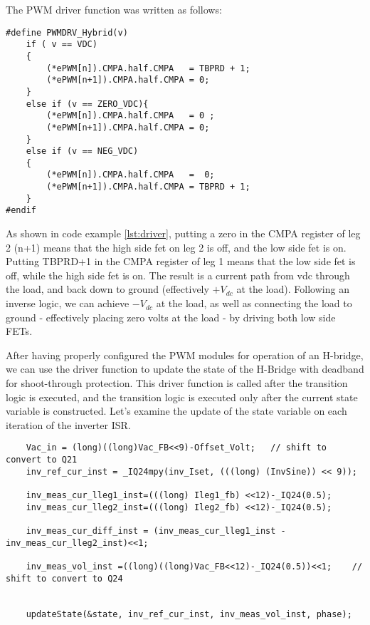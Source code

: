 The PWM driver function was written as follows:
\begin{lstlisting}[label={lst:driver}]
#define PWMDRV_Hybrid(v)
	if ( v == VDC)
	{
		(*ePWM[n]).CMPA.half.CMPA	= TBPRD + 1;
		(*ePWM[n+1]).CMPA.half.CMPA	= 0;
	}
	else if (v == ZERO_VDC){
		(*ePWM[n]).CMPA.half.CMPA	= 0 ;
		(*ePWM[n+1]).CMPA.half.CMPA	= 0;
	}
	else if (v == NEG_VDC)
	{
		(*ePWM[n]).CMPA.half.CMPA	=  0;
		(*ePWM[n+1]).CMPA.half.CMPA	= TBPRD + 1;
	}
#endif
\end{lstlisting}

As shown in code example \ref{lst:driver}, putting a zero in the CMPA register of leg 2 (n+1) means that the high side fet on leg 2 is off, and the low side fet is on. Putting TBPRD+1 in the CMPA register of  leg 1 means that the low side fet is off, while the high side fet is on. 
The result is a current path from vdc through the load, and back down to ground (effectively $+V_{dc}$ at the load). Following an inverse logic, we can achieve $-V_{dc}$ at the load, as well as connecting the load to ground - effectively placing zero volts at the load - by driving both low side FETs.

After having properly configured the PWM modules for operation of an H-bridge, we can use the driver function to update the state of the H-Bridge with deadband for shoot-through protection. This driver function is called after the transition logic is executed, and the transition logic is executed only after the current state variable is constructed. Let's examine the update of the state variable on each iteration of the inverter ISR. 

\begin{lstlisting}
	Vac_in = (long)((long)Vac_FB<<9)-Offset_Volt;	// shift to convert to Q21
	inv_ref_cur_inst = _IQ24mpy(inv_Iset, (((long) (InvSine)) << 9));

	inv_meas_cur_lleg1_inst=(((long) Ileg1_fb) <<12)-_IQ24(0.5);
	inv_meas_cur_lleg2_inst=(((long) Ileg2_fb) <<12)-_IQ24(0.5);

	inv_meas_cur_diff_inst = (inv_meas_cur_lleg1_inst - inv_meas_cur_lleg2_inst)<<1;

	inv_meas_vol_inst =((long)((long)Vac_FB<<12)-_IQ24(0.5))<<1;	// shift to convert to Q24


	updateState(&state, inv_ref_cur_inst, inv_meas_vol_inst, phase);
\end{lstlisting}
 
